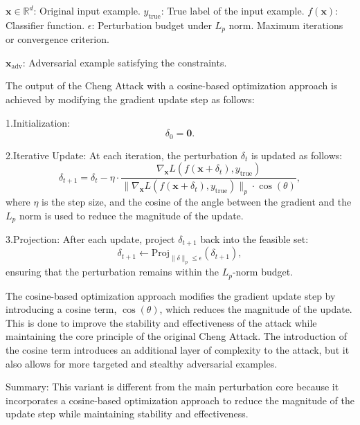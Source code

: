 $\mathbf{x} \in \mathbb{R}^d$: Original input example.
$y_{\text{true}}$: True label of the input example.
$f(\mathbf{x})$: Classifier function.
$\epsilon$: Perturbation budget under $L_p$ norm.
Maximum iterations or convergence criterion.

$\mathbf{x}_{\text{adv}}$: Adversarial example satisfying the constraints.

The output of the Cheng Attack with a cosine-based optimization approach is achieved by modifying the gradient update step as follows:

1.Initialization:
   \[
   \delta_0 = \mathbf{0}.
   \]

2.Iterative Update:
   At each iteration, the perturbation $\delta_t$ is updated as follows:
   \[
   \delta_{t+1} = \delta_t - \eta \cdot \frac{\nabla_{\mathbf{x}} L(f(\mathbf{x} + \delta_t), y_{\text{true}})}{\|\nabla_{\mathbf{x}} L(f(\mathbf{x} + \delta_t), y_{\text{true}})\|_p \cdot \cos(\theta)},
   \]
   where $\eta$ is the step size, and the cosine of the angle between the gradient and the $L_p$ norm is used to reduce the magnitude of the update.

3.Projection:
   After each update, project $\delta_{t+1}$ back into the feasible set:
   \[
   \delta_{t+1} \gets \text{Proj}_{\|\delta\|_p \leq \epsilon} (\delta_{t+1}),
   \]
   ensuring that the perturbation remains within the $L_p$-norm budget.

The cosine-based optimization approach modifies the gradient update step by introducing a cosine term, $\cos(\theta)$, which reduces the magnitude of the update. This is done to improve the stability and effectiveness of the attack while maintaining the core principle of the original Cheng Attack. The introduction of the cosine term introduces an additional layer of complexity to the attack, but it also allows for more targeted and stealthy adversarial examples.

Summary: This variant is different from the main perturbation core because it incorporates a cosine-based optimization approach to reduce the magnitude of the update step while maintaining stability and effectiveness.